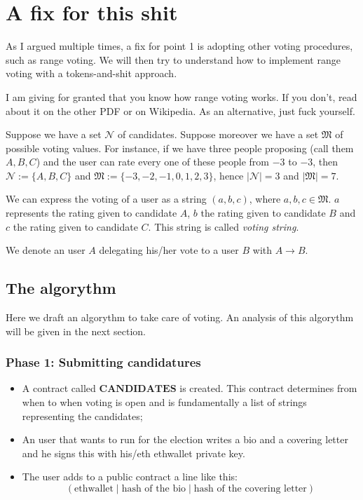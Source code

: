 \documentclass[submission, copyright,creativecommons,sharealike,noncommercial]{eptcs}
\begin{document}
\section{A fix for this shit}
	As I argued multiple times, a fix for point 1 is adopting other voting procedures, such as range voting. We will then try to understand how to implement range voting with a tokens-and-shit approach.
	
	I am giving for granted that you know how range voting works. If you don't, read about it on the other PDF or on Wikipedia. As an alternative, just fuck yourself.
	
	\begin{definition}\label{voting string}
		Suppose we have a set $\mathcal{N}$ of candidates. Suppose moreover we have a set $\mathfrak{M}$ of possible voting values. For instance, if we have three people proposing (call them $A, B, C$) and the user can rate every one of these people from $-3$ to $-3$, then $\mathcal{N} := \{A, B, C\}$ and $\mathfrak{M} := \{-3,-2,-1,0,1,2,3\}$, hence $|\mathcal{N}| = 3$ and $|\mathfrak{M}|=7$.
		
		We can express the voting of a user as a string $(a,b,c)$, where $a,b,c \in \mathfrak{M}$. $a$ represents the rating given to candidate $A$, $b$ the rating given to candidate $B$ and $c$ the rating given to candidate $C$. This string is called \emph{voting string}.
	\end{definition}
	\begin{definition}
 		We denote an user $A$ delegating his/her vote to a user $B$ with $A \to B$.
	\end{definition}
	
	\subsection{The algorythm}
		Here we draft an algorythm to take care of voting. An analysis of this algorythm will be given in the next section.
		\subsubsection{Phase 1: Submitting candidatures}
		
		\begin{itemize}
			\item A contract called $\textbf{CANDIDATES}$ is created. This contract determines from when to when voting is open and is fundamentally a list of strings representing the candidates;
			
			\item An user that wants to run for the election writes a bio and a covering letter and he signs this with his/eth ethwallet private key.
			
			\item The user adds to a public contract a line like this:
			\[
			(\text{ethwallet} \mid \text{hash of the bio} \mid \text{hash of the covering letter})
			\]
		\end{itemize}
		
\end{document}
